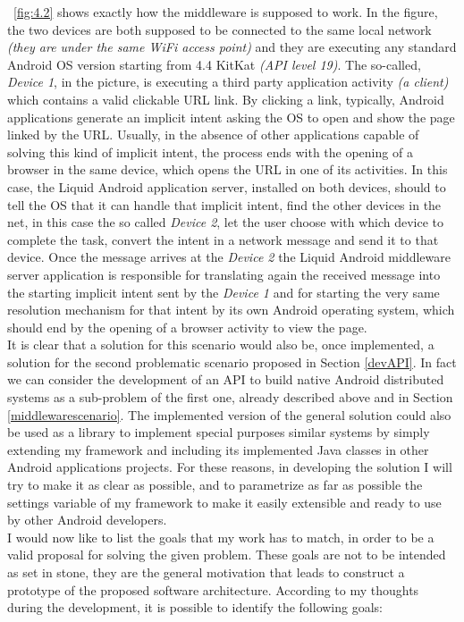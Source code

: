 \figurename~\ref{fig:4.2} shows exactly how the middleware is supposed to work. In the figure, the two devices are both supposed to be connected to the same local network \textit{(they are under the same WiFi access point)} and they are executing any standard Android OS version starting from 4.4 KitKat \textit{(API level 19)}. The so-called, \textit{Device 1}, in the picture, is executing a third party application activity \textit{(a client)}  which contains a valid clickable URL link. By clicking a link, typically, Android applications generate an implicit intent asking the OS to open and show the page linked by the URL. Usually, in the absence of other applications capable of solving this kind of implicit intent, the process ends with the opening of a browser in the same device, which opens the URL in one of its activities. In this case, the Liquid Android application server, installed on both devices, should to tell the OS that it can handle that implicit intent, find the other devices in the net, in this case the so called \textit{Device 2}, let the user choose with which device to complete the task, convert the intent in a network message and send it to that device. Once the message arrives at the \textit{Device 2} the Liquid Android middleware server application is responsible for translating again the received message into the starting implicit intent sent by the \textit{Device 1} and for starting the very same resolution mechanism for that intent by its own Android operating system, which should end by the opening of a browser activity to view the page.\\
It is clear that a solution for this scenario would also be, once implemented, a solution for the second problematic scenario proposed in Section \ref{devAPI}. In fact we can consider the development of an API to build native Android distributed systems as a sub-problem of the first one, already described above and in Section \ref{middlewarescenario}. The implemented version of the general solution could also be used as a library to implement special purposes similar systems by simply extending my framework and including its implemented Java classes in other Android applications projects. For these reasons, in developing the solution I will try to make it as clear as possible, and to parametrize as far as possible the settings variable of my framework to make it easily extensible and ready to use by other Android developers.\\
I would now like to list the goals that my work has to match, in order to be a valid proposal for solving the given problem. These goals are not to be intended as set in stone, they are the general motivation that leads to construct a prototype of the proposed software architecture. According to my thoughts during the development, it is possible to identify the following goals:

